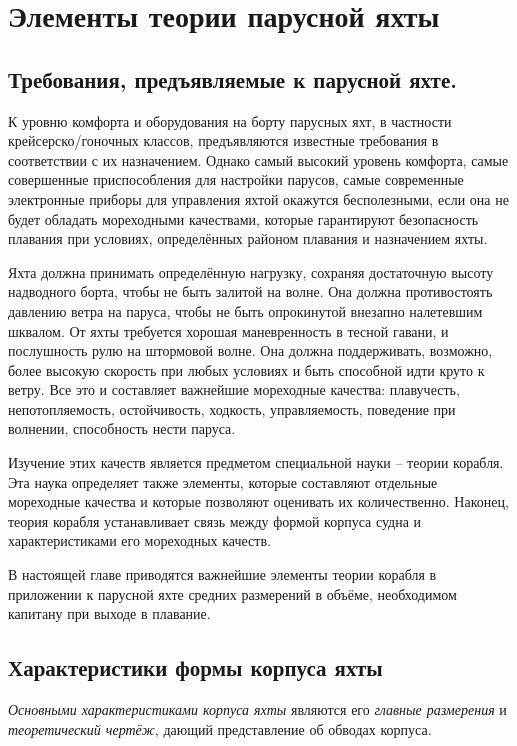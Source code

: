 \chapter{Элементы теории парусной яхты}

\section{Требования, предъявляемые к парусной яхте.}

К уровню комфорта и оборудования на борту парусных яхт, в частности
крейсерско\-/гоночных классов, предъявляются известные требования в
соответствии с их назначением. Однако самый высокий уровень комфорта,
самые совершенные приспособления для настройки парусов, самые
современные электронные приборы для управления яхтой окажутся
бесполезными, если она не будет обладать мореходными качествами,
которые гарантируют безопасность плавания при условиях, определённых
районом плавания и назначением яхты.

Яхта должна принимать определённую нагрузку, сохраняя достаточную
высоту надводного борта, чтобы не быть залитой на волне. Она должна
противостоять давлению ветра на паруса, чтобы не быть опрокинутой
внезапно налетевшим шквалом. От яхты требуется хорошая маневренность в
тесной гавани, и послушность рулю на штормовой волне. Она должна
поддерживать, возможно, более высокую скорость при любых условиях и
быть способной идти круто к ветру. Все это и составляет важнейшие
мореходные качества: плавучесть, непотопляемость, остойчивость,
ходкость, управляемость, поведение при волнении, способность нести
паруса.

Изучение этих качеств является предметом специальной науки \--- теории
корабля. Эта наука определяет также элементы, которые составляют
отдельные мореходные качества и которые позволяют оценивать их
количественно. Наконец, теория корабля устанавливает связь между
формой корпуса судна и характеристиками его мореходных качеств.

В настоящей главе приводятся важнейшие элементы теории корабля в
приложении к парусной яхте средних размерений в объёме, необходимом
капитану при выходе в плавание.

\section{Характеристики формы корпуса яхты}

\textit{Основными характеристиками
корпуса яхты} являются его \textit{главные размерения}
и \textit{теоретический чертёж}, дающий
представление об обводах корпуса.

